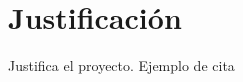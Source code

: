 



\section{Justificación}

Justifica el proyecto. Ejemplo de cita \cite{EI_UNAM} \cite{Optimizing_China}